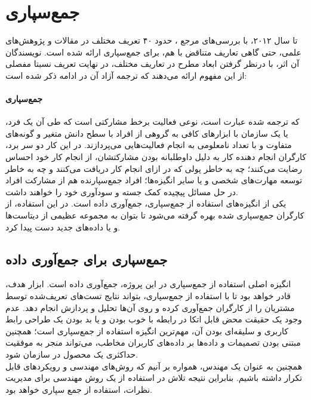 \section{جمع‌سپاری}
تا سال ۲۰۱۲، با بررسی‌های مرجع 
\cite{estelles-arolas_towards_2012}،
حدود ۴۰ تعریف مختلف در مقالات و پژوهش‌های علمی، حتی گاهی تعاریف متناقض با هم، برای جمع‌سپاری ارائه شده است. نویسندگان آن اثر، با درنظر گرفتن ابعاد مطرح در تعاریف مختلف، در نهایت تعریف نسبتا مفصلی از این مفهوم ارائه می‌دهند که ترجمه آزاد آن در ادامه ذکر شده است: \\
\paragraph{جمع‌سپاری}
که ترجمه شده عبارت
است، نوعی فعالیت برخط
مشارکتی است که طی آن یک فرد، یا یک سازمان با ابزارهای کافی به گروهی از افراد با سطح دانش متغیر و گونه‌های متفاوت و با تعداد نامعلومی به انجام فعالیت‌هایی می‌پردازند. در این کار دو سر برد، کارگران انجام دهنده کار
به دلیل داوطلبانه بودن مشارکتشان، از انجام کار خود احساس رضایت می‌کنند؛ چه به خاطر پولی که در ازای انجام کار دریافت می‌کنند و چه به خاطر توسعه مهارت‌های شخصی و یا سایر انگیزه‌ها؛ افراد جمع‌سپارنده هم از مشارکت افراد در حل مسائل پیچیده کمک جسته و سودآوری خود را خواهند داشت. \\
یکی از انگیزه‌های استفاده از جمع‌سپاری، جمع‌آوری داده
است. در این استفاده، از کارگران جمع‌سپاری شده بهره گرفته می‌شود تا بتوان به مجموعه عظیمی از دیتاست‌ها و یا داده‌های جدید دست پیدا کرد.
\subsection{جمع‌سپاری برای جمع‌آوری داده}
انگیزه اصلی استفاده از جمع‌سپاری در این پروژه، جمع‌آوری داده است. ابزار هدف، قادر خواهد بود تا با استفاده از جمع‌سپاری، بتواند نتایج تست‌های تعریف‌شده توسط مشتریان را از کارگران جمع‌آوری کرده و روی آن‌ها تحلیل و پردازش انجام دهد. عدم وجود یک حقیقت محض قابل اتکا
در رابطه با خوب بودن و یا بد بودن یک طراحی رابط کاربری و سلیقه‌ای بودن آن، مهم‌ترین انگیزه استفاده از جمع‌سپاری است؛ همچنین مبتنی بودن تصمیمات و داده‌ها بر داده‌های کاربران مخاطب، می‌تواند منجر به موفقیت حداکثری یک محصول در سازمان شود.\\
همچنین به عنوان یک مهندس، همواره بر آنیم که روش‌های مهندسی و رویکردهای قابل تکرار داشته باشیم. بنابراین نتیجه تلاش در استفاده از یک روش مهندسی برای مدیریت نظرات، استفاده از جمع سپاری خواهد بود.
